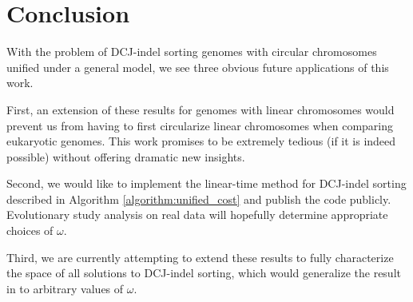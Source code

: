 \section{Conclusion}
With the problem of DCJ-indel sorting genomes with circular chromosomes unified under a general model, we see three obvious future applications of this work.

First, an extension of these results for genomes with linear chromosomes would prevent us from having to first circularize linear chromosomes when comparing eukaryotic genomes.  This work promises to be extremely tedious (if it is indeed possible) without offering dramatic new insights.

Second, we would like to implement the linear-time method for DCJ-indel sorting described in Algorithm \ref{algorithm:unified_cost} and publish the code publicly.  Evolutionary study analysis on real data will hopefully determine appropriate choices of $\omega$.

Third, we are currently attempting to extend these results to fully characterize the space of all solutions to DCJ-indel sorting, which would generalize the result in \cite{compeau2013} to arbitrary values of $\omega$.